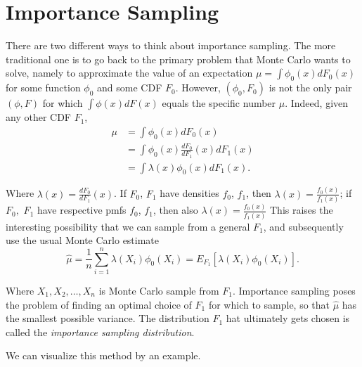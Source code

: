 \section{Importance Sampling}
\label{sec:importance_sampling}

There are two different ways to think about importance sampling.
The more traditional one is to go back to the primary problem that
Monte Carlo  wants to solve,
namely to approximate the value of an expectation
$\mu = \int \phi_0(x)dF_0(x) $ for some function $\phi_0$ and some CDF $F_0$.
However, $(\phi_0,F_0)$ is not the only pair $(\phi,F)$ for which
$\int \phi(x)dF(x) $ equals the specific number $\mu$. Indeed, given any other
CDF $F_1$,
\begin{align*}
	\mu & = \int \phi_0(x)dF_0(x)                      \\
	    & = \int \phi_0(x)\frac{dF_0}{dF_1}(x) dF_1(x) \\
	    & = \int \lambda(x)\phi_0(x)dF_1(x).
\end{align*}

Where $\lambda(x)=\frac{dF_0}{dF_1}(x)$. If $F_0$, $F_1$ have densities
$f_0$, $f_1$, then $\lambda(x)=\frac{f_0(x)}{f_1(x)}$; if $F_0,$ $F_1$
have respective pmfs $f_0$, $f_1$, then also $\lambda(x)=\frac{f_0(x)}{f_1(x)}$
This raises the interesting possibility that we can sample from a general $F_1$, and
subsequently use the usual Monte Carlo estimate
\[
	\hat{\mu} = \frac{1}{n} \sum_{i = 1}^{n} \lambda(X_i)\phi_0(X_i) = E_{F_1}[\lambda(X_i)\phi_0(X_i)].
\]

Where $X_1, X_2, \ldots, X_n$ is Monte Carlo sample from $F_1$.
Importance sampling poses the problem of finding an optimal choice of $F_1$ for which to sample,
so that $\hat{\mu}$ has the smallest possible variance.
The distribution $F_1$ hat ultimately gets
chosen is called the \textit{importance sampling distribution}.

We can visualize this method by an example.


